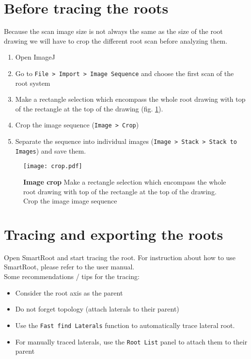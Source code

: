 \documentclass[a4paper,english,10pt]{report}
\begin{document}
\section{Before tracing the roots}

Because the scan image size is not always the same as the size of the root drawing we will have to crop the different root scan before analyzing them.\\

\begin{enumerate}
\item Open ImageJ
\item Go to \verb|File > Import > Image Sequence| and choose the first scan of the root system
\item Make a rectangle selection which encompass the whole root drawing with top of the rectangle at the top of the drawing (fig. \ref{crop}).
\item Crop the image sequence (\verb|Image > Crop|)
\item Separate the sequence into individual images (\verb|Image > Stack > Stack to Images|) and save them.
\end{enumerate}

\begin{figure}[htbp]
\begin{center}
\texttt{[image: crop.pdf]}
\caption[Image crop]{\textbf{Image crop} Make a rectangle selection which encompass the whole root drawing with top of the rectangle at the top of the drawing. Crop the image image sequence}
\label{crop}
\end{center}
\end{figure}

\section{Tracing and exporting the roots}

Open SmartRoot and start tracing the root. For instruction about how to use SmartRoot, please refer to the user manual.\\

Some recommendations / tips for the tracing:

\begin{itemize}
\item Consider the root axis as the parent
\item Do not forget topology (attach laterals to their parent)
\item Use the \verb|Fast find Laterals| function to automatically trace lateral root.
\item For manually traced laterals, use the \verb|Root List| panel to attach them to their parent\\
\end{itemize}
\end{document}
